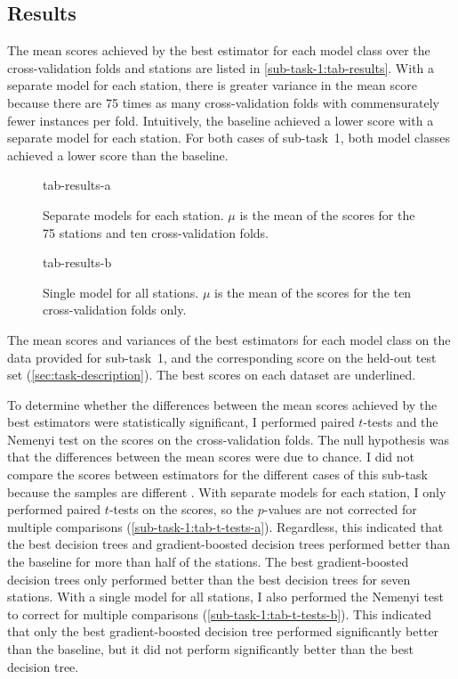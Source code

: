 \subsection{Results}
\label{sec:sub-task-1:results}

The mean scores achieved by the best estimator for each model class over the
cross-validation folds and stations are listed in \cref{sub-task-1:tab-results}.
With a separate model for each station, there is greater variance in the mean score
because there are 75 times as many cross-validation folds with commensurately fewer
instances per fold.
Intuitively, the baseline achieved a lower score with a separate model for each
station.
For both cases of sub-task~1, both model classes achieved a lower score than the
baseline.

\begin{table}
  \centering
  \begin{subfigure}{\textwidth}
    \centering
    {tab-results-a}
    \caption{
      Separate models for each station.
      $\mu$ is the mean of the scores for the 75 stations and ten cross-validation folds.
    }
    \label{sub-task-1:tab-results-a}
  \end{subfigure}
  \subfigurespace
  \begin{subfigure}{\textwidth}
    \centering
    {tab-results-b}
    \caption{
      Single model for all stations.
      $\mu$ is the mean of the scores for the ten cross-validation folds only.}
    \label{sub-task-1:tab-results-b}
  \end{subfigure}
  \caption{
    The mean scores and variances of the best estimators for each model class on the
    data provided for sub-task~1, and the corresponding score on the held-out test set
    (\cref{sec:task-description}).
    The best scores on each dataset are underlined.
  }
  \label{sub-task-1:tab-results}
\end{table}

To determine whether the differences between the mean scores achieved by the best
estimators were statistically significant, I performed paired $t$-tests and the Nemenyi
test on the scores on the cross-validation folds.
The null hypothesis was that the differences between the mean scores were due to
chance.
I did not compare the scores between estimators for the different cases of this
sub-task because the samples are different \parencite[354]{Flach2012}.
With separate models for each station, I only performed paired $t$-tests on the scores,
so the $p$-values are not corrected for multiple comparisons
(\cref{sub-task-1:tab-t-tests-a}).
Regardless, this indicated that the best decision trees and gradient-boosted decision
trees performed better than the baseline for more than half of the stations.
The best gradient-boosted decision trees only performed better than the best decision
trees for seven stations.
With a single model for all stations, I also performed the Nemenyi test to correct for
multiple comparisons (\cref{sub-task-1:tab-t-tests-b}).
This indicated that only the best gradient-boosted decision tree performed
significantly better than the baseline, but it did not perform significantly better
than the best decision tree.

